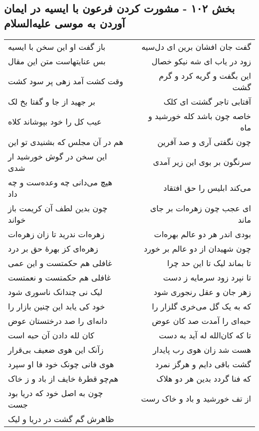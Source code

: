 \begin{center}
\section*{بخش ۱۰۲ - مشورت کردن فرعون با ایسیه در ایمان آوردن به موسی علیه‌السلام}
\label{sec:sh102}
\begin{longtable}{l p{0.5cm} r}
باز گفت او این سخن با ایسیه
&&
گفت جان افشان برین ای دل‌سیه
\\
بس عنایتهاست متن این مقال
&&
زود در یاب ای شه نیکو خصال
\\
وقت کشت آمد زهی پر سود کشت
&&
این بگفت و گریه کرد و گرم گشت
\\
بر جهید از جا و گفتا بخ لک
&&
آفتابی تاجر گشتت ای کلک
\\
عیب کل را خود بپوشاند کلاه
&&
خاصه چون باشد کله خورشید و ماه
\\
هم در آن مجلس که بشنیدی تو این
&&
چون نگفتی آری و صد آفرین
\\
این سخن در گوش خورشید ار شدی
&&
سرنگون بر بوی این زیر آمدی
\\
هیچ می‌دانی چه وعده‌ست و چه داد
&&
می‌کند ابلیس را حق افتقاد
\\
چون بدین لطف آن کریمت باز خواند
&&
ای عجب چون زهره‌ات بر جای ماند
\\
زهره‌ات ندرید تا زان زهره‌ات
&&
بودی اندر هر دو عالم بهره‌ات
\\
زهره‌ای کز بهرهٔ حق بر درد
&&
چون شهیدان از دو عالم بر خورد
\\
غافلی هم حکمتست و این عمی
&&
تا بماند لیک تا این حد چرا
\\
غافلی هم حکمتست و نعمتست
&&
تا نپرد زود سرمایه ز دست
\\
لیک نی چندانک ناسوری شود
&&
زهر جان و عقل رنجوری شود
\\
خود کی یابد این چنین بازار را
&&
که به یک گل می‌خری گلزار را
\\
دانه‌ای را صد درختستان عوض
&&
حبه‌ای را آمدت صد کان عوض
\\
کان لله دادن آن حبه است
&&
تا که کان‌الله له آید به دست
\\
زآنک این هوی ضعیف بی‌قرار
&&
هست شد زان هوی رب پایدار
\\
هوی فانی چونک خود فا او سپرد
&&
گشت باقی دایم و هرگز نمرد
\\
هم‌چو قطرهٔ خایف از باد و ز خاک
&&
که فنا گردد بدین هر دو هلاک
\\
چون به اصل خود که دریا بود جست
&&
از تف خورشید و باد و خاک رست
\\
ظاهرش گم گشت در دریا و لیک
&&

\end{longtable}
\end{center}
